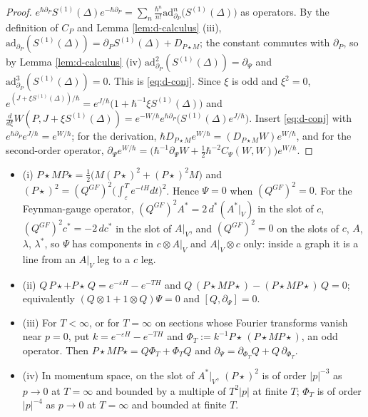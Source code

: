 \begin{proof}
$e^{\hbar\partial_P}S^{(1)}(\Delta)e^{-\hbar\partial_P}=\sum_n\frac{\hbar^n}{n!}\mathrm{ad}_{\partial_P}^n\big(S^{(1)}(\Delta)\big)$ as operators. By the definition of $C_P$ and Lemma \ref{lem:d-calculus} (iii), $\mathrm{ad}_{\partial_P}(S^{(1)}(\Delta))=\partial_PS^{(1)}(\Delta)+D_{P\star M}$; the constant commutes with $\partial_P$, so by Lemma \ref{lem:d-calculus} (iv) $\mathrm{ad}^2_{\partial_P}(S^{(1)}(\Delta))=\partial_\Psi$ and $\mathrm{ad}^3_{\partial_P}(S^{(1)}(\Delta))=0$. This is \eqref{eq:d-conj}. Since $\xi$ is odd and $\xi^2=0$, $e^{(J+\xi S^{(1)}(\Delta))/\hbar}=e^{J/\hbar}\big(1+\hbar^{-1}\xi S^{(1)}(\Delta)\big)$ and $\frac{d}{d\xi}W(P,J+\xi S^{(1)}(\Delta))=e^{-W/\hbar}e^{\hbar\partial_P}\big(S^{(1)}(\Delta)e^{J/\hbar}\big)$. Insert \eqref{eq:d-conj} with $e^{\hbar\partial_P}e^{J/\hbar}=e^{W/\hbar}$; for the derivation, $\hbar D_{P\star M}e^{W/\hbar}=(D_{P\star M}W)e^{W/\hbar}$, and for the second-order operator, $\partial_\Psi e^{W/\hbar}=\big(\hbar^{-1}\partial_\Psi W+\tfrac12\hbar^{-2}C_\Psi(W,W)\big)e^{W/\hbar}$.
\end{proof}

\begin{proposition}
\label{prop:d-psi}
\begin{itemize}
\item (i) $P\star MP\star=\tfrac12\big(M(P\star)^2+(P\star)^2M\big)$ and $(P\star)^2=(Q^{GF})^2\big(\int_\varepsilon^Te^{-tH}dt\big)^2$. Hence $\Psi=0$ when $(Q^{GF})^2=0$. For the Feynman-gauge operator, $(Q^{GF})^2A^*=2\,d^*(A^*|_V)$ in the slot of $c$, $(Q^{GF})^2c^*=-2\,dc^*$ in the slot of $A|_V$, and $(Q^{GF})^2=0$ on the slots of $c$, $A$, $\lambda$, $\lambda^*$, so $\Psi$ has components in $c\otimes A|_V$ and $A|_V\otimes c$ only: inside a graph it is a line from an $A|_V$ leg to a $c$ leg.
\item (ii) $Q\,P\star+P\star\,Q=e^{-\varepsilon H}-e^{-TH}$ and $Q\,(P\star MP\star)-(P\star MP\star)\,Q=0$; equivalently $(Q\otimes1+1\otimes Q)\Psi=0$ and $[Q,\partial_\Psi]=0$.
\item (iii) For $T<\infty$, or for $T=\infty$ on sections whose Fourier transforms vanish near $p=0$, put $k=e^{-\varepsilon H}-e^{-TH}$ and $\Phi_T:=k^{-1}P\star\,(P\star MP\star)$, an odd operator. Then $P\star MP\star=Q\Phi_T+\Phi_TQ$ and $\partial_\Psi=\partial_{\Phi_T}Q+Q\,\partial_{\Phi_T}$.
\item (iv) In momentum space, on the slot of $A^*|_V$, $(P\star)^2$ is of order $|p|^{-3}$ as $p\to0$ at $T=\infty$ and bounded by a multiple of $T^2|p|$ at finite $T$; $\Phi_T$ is of order $|p|^{-4}$ as $p\to0$ at $T=\infty$ and bounded at finite $T$.
\end{itemize}
\end{proposition}

